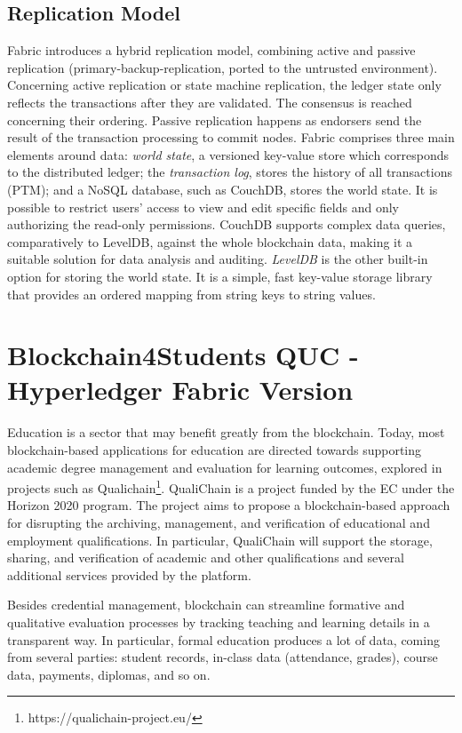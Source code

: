 \documentclass[12pt,a4paper]{article}
\theoremstyle{definition}
\begin{document}
\subsection{Replication Model}
Fabric introduces a hybrid replication model, combining active and passive replication (primary-backup-replication, ported to the untrusted environment). Concerning active replication or state machine replication, the ledger state only reflects the transactions after they are validated. The consensus is reached concerning their ordering.  Passive replication happens as endorsers send the result of the transaction processing to commit nodes. Fabric comprises three main elements around data: \emph{world state}, a versioned key-value store which corresponds to the distributed ledger; the \emph{transaction log}, stores the history of all transactions (PTM); and a NoSQL database, such as CouchDB, stores the world state. It is possible to restrict users' access to view and edit specific fields and only authorizing the read-only permissions.  CouchDB supports complex data queries, comparatively to LevelDB, against the whole blockchain data, making it a suitable solution for data analysis and auditing. \emph{LevelDB} is the other built-in option for storing the world state. It is a simple, fast key-value storage library that provides an ordered mapping from string keys to string values.


\section{Blockchain4Students QUC - Hyperledger Fabric Version}
Education is a sector that may benefit greatly from the blockchain. Today, most blockchain-based applications for education are directed towards supporting academic degree management and evaluation for learning outcomes, explored in projects such as Qualichain\footnote{https://qualichain-project.eu/}. QualiChain is a project funded by the EC under the Horizon 2020 program. The project aims to propose a blockchain-based approach for disrupting the archiving, management, and verification of educational and employment qualifications. In particular, QualiChain will support the storage,  sharing, and verification of academic and other qualifications and several additional services provided by the platform.

Besides credential management, blockchain can streamline formative and qualitative evaluation processes by tracking teaching and learning details in a transparent way. In particular, formal education produces a lot of data, coming from several parties: student records, in-class data (attendance, grades), course data, payments, diplomas, and so on. %
\end{document}
